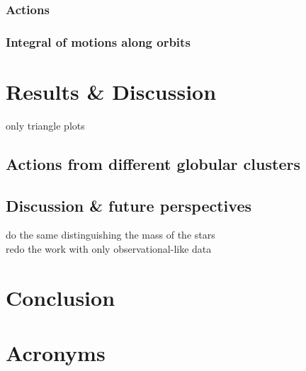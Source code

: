 \documentclass[a4paper,12pt,abstracton]{scrartcl}
\begin{document}
\subsubsection{Actions}
\subsubsection{Integral of motions along orbits}
\newpage
\section{Results \& Discussion}
only triangle plots

\subsection{Actions from different globular clusters}
\subsection{Discussion \& future perspectives}
do the same distinguishing the mass of the stars\\
redo the work with only observational-like data
\newpage
\section{Conclusion}
\newpage 
\section{Acronyms}

\begin{acronym}[SMBHs]
\end{acronym}
\end{document}
